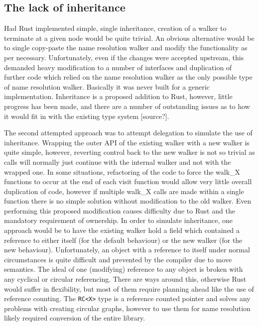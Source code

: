 \subsection{The lack of inheritance}
Had Rust implemented simple, single inheritance, creation of a walker to terminate at a given node would be quite trivial. An obvious alternative would be to single copy-paste the name resolution walker and modify the functionality as per necessary. Unfortunately, even if the changes were accepted upstream, this demanded heavy modification to a number of interfaces and duplication of further code which relied on the name resolution walker as the only possible type of name resolution walker. Basically it was never built for a generic implementation. Inheritance is a proposed addition to Rust, however, little progress has been made, and there are a number of outstanding issues as to how it would fit in with the existing type system [source?].

The second attempted approach was to attempt delegation to simulate the use of inheritance. Wrapping the outer API of the existing walker with a new walker is quite simple, however, reverting control back to the new walker is not so trivial as calls will normally just continue with the internal walker and not with the wrapped one. In some situations, refactoring of the code to force the walk\_X functions to occur at the end of each visit function would allow very little overall duplication of code, however if multiple walk\_X calls are made within a single function there is no simple solution without modification to the old walker. Even performing this proposed modification causes difficulty due to Rust and the mandatory requirement of ownership. In order to simulate inheritance, one approach would be to have the existing walker hold a field which contained a reference to either itself (for the default behaviour) or the new walker (for the new behaviour). Unfortunately, an object with a reference to itself under normal circumstances is quite difficult and prevented by the compiler due to move semantics. The ideal of one (modifying) reference to any object is broken with any cyclical or circular referencing. There are ways around this, otherwise Rust would suffer in flexibility, but most of them require planning ahead like the use of reference counting. The {\verb|RC<X>|} type is a reference counted pointer and solves any problems with creating circular graphs, however to use them for name resolution likely required conversion of the entire library.

